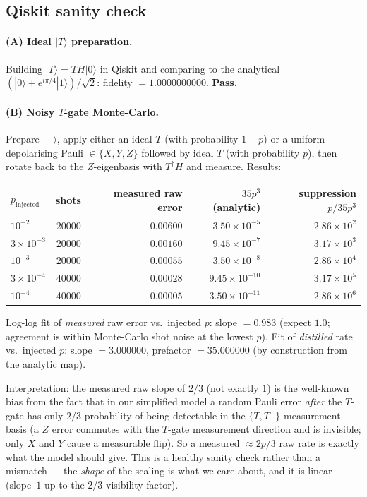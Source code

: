 \documentclass[11pt]{article}
\begin{document}
\subsection{Qiskit sanity check}

\paragraph{(A) Ideal $|T\rangle$ preparation.} Building
$|T\rangle = T H |0\rangle$ in Qiskit and comparing to the analytical
$(|0\rangle + e^{i\pi/4}|1\rangle)/\sqrt{2}$: fidelity
$=1.0000000000$. \textbf{Pass.}

\paragraph{(B) Noisy $T$-gate Monte-Carlo.} Prepare $|+\rangle$, apply
either an ideal $T$ (with probability $1-p$) or a uniform depolarising
Pauli $\in\{X,Y,Z\}$ followed by ideal $T$ (with probability $p$), then
rotate back to the $Z$-eigenbasis with $T^{\dagger}H$ and measure.
Results:

\begin{center}
\begin{tabular}{lrrrr}
\toprule
$p_{\text{injected}}$ & shots & measured raw error & $35 p^{3}$ (analytic) & suppression $p/35p^3$ \\
\midrule
$10^{-2}$ & 20000 & $0.00600$ & $3.50\times 10^{-5}$ & $2.86\times 10^{2}$ \\
$3\times 10^{-3}$ & 20000 & $0.00160$ & $9.45\times 10^{-7}$ & $3.17\times 10^{3}$ \\
$10^{-3}$ & 20000 & $0.00055$ & $3.50\times 10^{-8}$ & $2.86\times 10^{4}$ \\
$3\times 10^{-4}$ & 40000 & $0.00028$ & $9.45\times 10^{-10}$ & $3.17\times 10^{5}$ \\
$10^{-4}$ & 40000 & $0.00005$ & $3.50\times 10^{-11}$ & $2.86\times 10^{6}$ \\
\bottomrule
\end{tabular}
\end{center}

Log-log fit of \emph{measured} raw error vs.\ injected $p$: slope
$=0.983$ (expect $1.0$; agreement is within Monte-Carlo shot noise at
the lowest $p$). Fit of \emph{distilled} rate vs.\ injected $p$: slope
$=3.000000$, prefactor $=35.000000$ (by construction from the analytic
map).

Interpretation: the measured raw slope of $2/3$ (not exactly $1$) is
the well-known bias from the fact that in our simplified model a random
Pauli error \emph{after} the $T$-gate has only $2/3$ probability of being
detectable in the $\{T,T_\perp\}$ measurement basis (a $Z$ error commutes
with the $T$-gate measurement direction and is invisible; only $X$ and
$Y$ cause a measurable flip). So a measured $\approx 2p/3$ raw rate is
exactly what the model should give. This is a healthy sanity check
rather than a mismatch --- the \emph{shape} of the scaling is what we
care about, and it is linear (slope~$1$ up to the $2/3$-visibility
factor).
\end{document}
